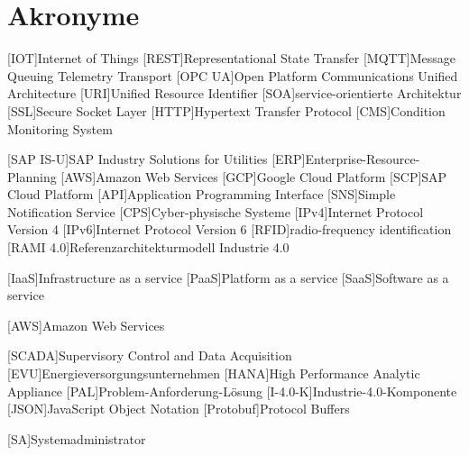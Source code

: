 \section*{Akronyme}            %
\begin{acronym}[SAP IS-U]
  [IOT]{Internet of Things}
  [REST]{Representational State Transfer}
  [MQTT]{Message Queuing Telemetry Transport}
  [OPC UA]{Open Platform Communications Unified Architecture}
  [URI]{Unified Resource Identifier}
  [SOA]{service-orientierte Architektur}
  [SSL]{Secure Socket Layer}
  [HTTP]{Hypertext Transfer Protocol}
  [CMS]{Condition Monitoring System}

  [SAP IS-U]{SAP Industry Solutions for Utilities}
  [ERP]{Enterprise-Resource-Planning}
  [AWS]{Amazon Web Services}
  [GCP]{Google Cloud Platform}
  [SCP]{SAP Cloud Platform}
  [API]{Application Programming Interface}
  [SNS]{Simple Notification Service}
  [CPS]{Cyber-physische Systeme}
  [IPv4]{Internet Protocol Version 4}
  [IPv6]{Internet Protocol Version 6}
  [RFID]{radio-frequency identification}
  [RAMI 4.0]{Referenzarchitekturmodell Industrie 4.0}

[IaaS]{Infrastructure as a service}
[PaaS]{Platform as a service}
[SaaS]{Software as a service}

[AWS]{Amazon Web Services}


[SCADA]{Supervisory Control and Data Acquisition}
[EVU]{Energieversorgungsunternehmen}
[HANA]{High Performance Analytic Appliance}
[PAL]{Problem-Anforderung-Lösung}
[I-4.0-K]{Industrie-4.0-Komponente}
[JSON]{JavaScript Object Notation}
[Protobuf]{Protocol Buffers}

[SA]{Systemadministrator}

\end{acronym}

\newpage

\listoffigures
{}
\listoftables
{}
\lstlistoflistings
{}
\newpage
